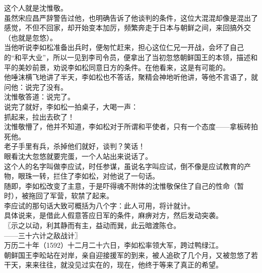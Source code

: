 \begin{multicols}{\theparacolNo}
这个人就是沈惟敬。\\

虽然宋应昌严辞警告过他，也明确告诉了他谈判的条件，这位大混混却像是混出了感觉，不但不回家，却开始变本加厉，频繁奔走于日本与朝鲜之间，来回搞外交（也就是忽悠）。\\

当他听说李如松准备出兵时，便匆忙赶来，担心这位仁兄一开战，会坏了自己的“和平大业”，所以一见到李司令员，便拿出了当初忽悠朝鲜国王的本领，描述和平的美妙前景，劝说李如松同意日方的条件。在他看来，这是有可能的。\\

他唾沫横飞地讲了半天，李如松也不答话，聚精会神地听他讲，等他不言语了，就问他：说完了没有。\\

沈惟敬答道：说完了。\\

说完了就好，李如松一拍桌子，大喝一声：\\

抓起来，拉出去砍了！\\

沈惟敬懵了，他并不知道，李如松对于所谓和平使者，只有一个态度——拿板砖拍死他。\\

老子手里有兵，杀掉他们就好，谈判？笑话！\\

眼看沈大忽悠就要完蛋，一个人站出来说话了。\\

这个人的名字叫做李应试，时任参谋，虽说名字叫应试，倒不像是应试教育的产物，眼珠一转，拦住了李如松，对他说了一句话。\\

随即，李如松改变了主意，于是吓得魂不附体的沈惟敬保住了自己的性命（暂时），被拖回了军营，软禁了起来。\\

李应试的那句话大致可概括为八个字：此人可用，将计就计。\\

具体说来，是借此人假意答应日军的条件，麻痹对方，然后发动突袭。\\

〖示之以动，利其静而有主，益动而巽，此云暗渡陈仓。\\

——三十六计之敌战计〗\\

万历二十年（1592）十二月二十六日，李如松率领大军，跨过鸭绿江。\\

朝鲜国王李昖站在对岸，亲自迎接援军的到来，被人追砍了几个月，又被忽悠了若干天，来来往往，就没见过实在的，现在，他终于等来了真正的希望。\\


\end{multicols}
